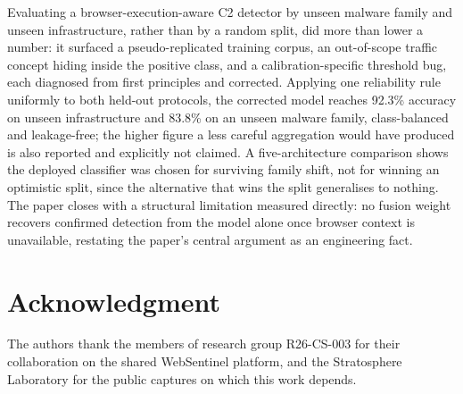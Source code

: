\documentclass[conference,a4paper]{IEEEtran}
\begin{document}
Evaluating a browser-execution-aware C2 detector by unseen malware family and unseen infrastructure, rather than by a random split, did more than lower a number: it surfaced a pseudo-replicated training corpus, an out-of-scope traffic concept hiding inside the positive class, and a calibration-specific threshold bug, each diagnosed from first principles and corrected. Applying one reliability rule uniformly to both held-out protocols, the corrected model reaches 92.3\% accuracy on unseen infrastructure and 83.8\% on an unseen malware family, class-balanced and leakage-free; the higher figure a less careful aggregation would have produced is also reported and explicitly not claimed. A five-architecture comparison shows the deployed classifier was chosen for surviving family shift, not for winning an optimistic split, since the alternative that wins the split generalises to nothing. The paper closes with a structural limitation measured directly: no fusion weight recovers confirmed detection from the model alone once browser context is unavailable, restating the paper's central argument as an engineering fact.

\section*{Acknowledgment}
The authors thank the members of research group R26-CS-003 for their collaboration on the shared WebSentinel platform, and the Stratosphere Laboratory for the public captures on which this work depends.



\end{document}
